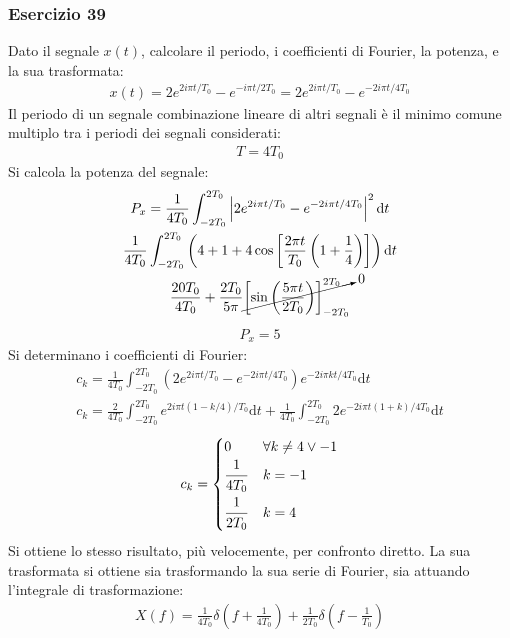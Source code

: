 \documentclass{article}
\newcommand{\df}{\mathrm{d}}
\begin{document}
\subsubsection*{Esercizio 39}

Dato il segnale $x(t)$, calcolare il periodo, i coefficienti di Fourier, la potenza, e la sua trasformata:
\begin{gather*}
    x(t)=2e^{2i\pi t/T_0}-e^{-i\pi t/2T_0}=2e^{2i\pi t/T_0}-e^{-2i\pi t/4T_0}
\end{gather*}
Il periodo di un segnale combinazione lineare di altri segnali è il minimo comune multiplo tra i periodi dei segnali considerati:
\begin{gather}
    T=4T_0
\end{gather}
Si calcola la potenza del segnale:
\begin{gather*}
    P_x=\displaystyle\frac{1}{4T_0}\int_{-2T_0}^{2T_0}\left|2e^{2i\pi t/T_0}-e^{-2i\pi t/4T_0}\right|^2\df t\\
    \displaystyle\frac{1}{4T_0}\int_{-2T_0}^{2T_0}\left(4+1+4\cos\left[\frac{2\pi t}{T_0}\left(1+\frac{1}{4}\right)\right]\right)\df t\\
    \displaystyle\frac{20T_0}{4T_0}+\frac{2T_0}{5\pi }\cancelto{0}{\left[\sin\left(\frac{5\pi t}{2T_0}\right)\right]_{-2T_0}^{2T_0}}
\end{gather*}
\begin{gather}
    P_x=5
\end{gather}
Si determinano i coefficienti di Fourier:
\begin{gather*}
    c_k=\displaystyle\frac{1}{4T_0}\int_{-2T_0}^{2T_0}\left(2e^{2i\pi t/T_0}-e^{-2i\pi t/4T_0}\right)e^{-2i\pi kt/4T_0}\df t\\
    c_k=\displaystyle\frac{2}{4T_0}\int_{-2T_0}^{2T_0}e^{2i\pi t(1-k/4)/T_0}\df t+\frac{1}{4T_0}\int_{-2T_0}^{2T_0}2e^{-2i\pi t(1+k)/4T_0}\df t
\end{gather*}
\begin{gather}
    c_k=\begin{cases}
        0 &\forall k\neq4\lor-1\\
        \displaystyle\frac{\strut 1}{\strut 4T_0}& k=-1\\
        \displaystyle\frac{\strut 1}{\strut 2T_0}&k=4
    \end{cases}
\end{gather}
Si ottiene lo stesso risultato, più velocemente, per confronto diretto. La sua trasformata si ottiene sia trasformando la sua serie di Fourier, sia attuando l'integrale 
di trasformazione:
\begin{gather}
    X(f)=\displaystyle\frac{1}{4T_0}\delta\left(f+\frac{1}{4T_0}\right)+\frac{1}{2T_0}\delta\left(f-\frac{1}{T_0}\right)
\end{gather}
\end{document}
